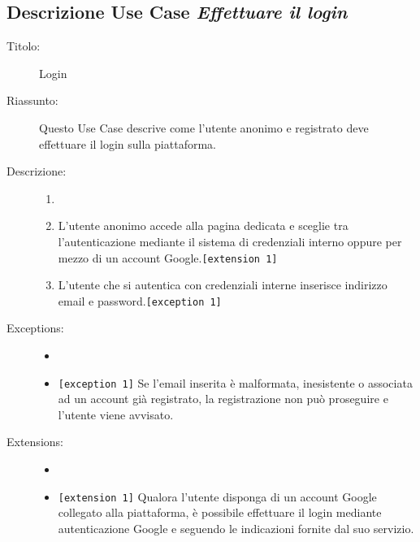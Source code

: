 \documentclass[11pt, a4paper]{article}
\theoremstyle{definition} %
\begin{document}
\subsection*{Descrizione Use Case \textit{Effettuare il login}}
\begin{description}
    \item[Titolo:] Login
    
    \item[Riassunto:] Questo Use Case descrive come l'utente anonimo e registrato deve
    effettuare il login sulla piattaforma.

    \item[Descrizione:]
    \begin{enumerate}
        \item[]
        \item L'utente anonimo accede alla pagina dedicata e sceglie tra l'autenticazione mediante il sistema di credenziali interno oppure per mezzo di un account Google.\texttt{[extension 1]}
        \item L'utente che si autentica con credenziali interne inserisce indirizzo email e password.\texttt{[exception 1]}
    \end{enumerate}
    
    \item[Exceptions:]
    \begin{itemize}
        \item[]
        \item \verb|[exception 1]| Se l'email inserita è malformata, inesistente o associata ad un account già registrato, la registrazione non può proseguire e l'utente viene avvisato.
    \end{itemize}

    \item[Extensions:]
    \begin{itemize}
        \item[]
        \item \texttt{[extension 1]} Qualora l'utente disponga di un account Google collegato alla piattaforma, è possibile effettuare il login
        mediante autenticazione Google e seguendo le indicazioni fornite dal suo servizio.
    \end{itemize}
\end{description}
\end{document}
